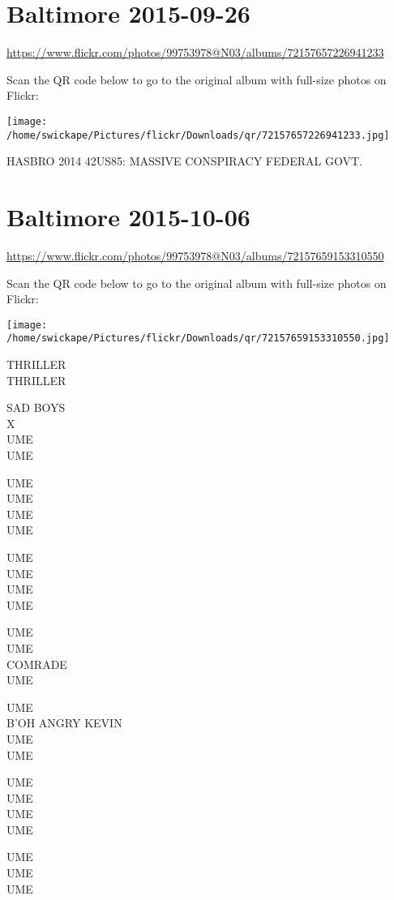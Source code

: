 \documentclass[10pt,letterpaper]{article}
\begin{document}
\section*{Baltimore 2015-09-26}

\url{https://www.flickr.com/photos/99753978@N03/albums/72157657226941233}

Scan the QR code below to go to the original album with full-size photos on Flickr:

\texttt{[image: /home/swickape/Pictures/flickr/Downloads/qr/72157657226941233.jpg]}
\pagebreak

HASBRO 2014 42US85: MASSIVE CONSPIRACY FEDERAL GOVT.
\pagebreak

\section*{Baltimore 2015-10-06}

\url{https://www.flickr.com/photos/99753978@N03/albums/72157659153310550}

Scan the QR code below to go to the original album with full-size photos on Flickr:

\texttt{[image: /home/swickape/Pictures/flickr/Downloads/qr/72157659153310550.jpg]}
\pagebreak

THRILLER\\
THRILLER

SAD BOYS\\
X\\
UME\\
UME

UME\\
UME\\
UME\\
UME

UME\\
UME\\
UME\\
UME

UME\\
UME\\
COMRADE\\
UME

UME\\
B'OH ANGRY KEVIN\\
UME\\
UME

UME\\
UME\\
UME\\
UME

UME\\
UME\\
UME
\end{document}
